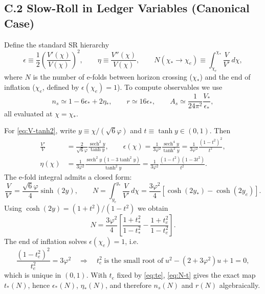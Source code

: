 \documentclass[11pt]{article}
\theoremstyle{definition}
\theoremstyle{remark}
\begin{document}
\subsection*{C.2 Slow-Roll in Ledger Variables (Canonical Case)}
Define the standard SR hierarchy
\begin{equation}
\epsilon \equiv \frac{1}{2}\left(\frac{V'(\chi)}{V(\chi)}\right)^2,\qquad
\eta \equiv \frac{V''(\chi)}{V(\chi)},
\qquad
N(\chi_*\to \chi_e) \equiv \int_{\chi_e}^{\chi_*}\frac{V}{V'}\,d\chi,
\label{eq:SR-defs}
\end{equation}
where $N$ is the number of e-folds between horizon crossing ($\chi_*$) and the end of inflation ($\chi_e$, defined by $\epsilon(\chi_e)=1$). To compute observables we use
\begin{equation}
n_s \simeq 1-6\epsilon_*+2\eta_*, \qquad r \simeq 16\epsilon_*, \qquad
A_s \simeq \frac{1}{24\pi^2}\frac{V_*}{\epsilon_*},
\label{eq:ns-r-As}
\end{equation}
all evaluated at $\chi=\chi_*$.

For \eqref{eq:V-tanh2}, write $y\equiv\chi/(\sqrt{6}\varphi)$ and $t\equiv\tanh y\in(0,1)$. Then
\begin{align}
\frac{V'}{V} &= \frac{2}{\sqrt{6}\varphi}\frac{\operatorname{sech}^2 y}{\tanh y},\qquad
\epsilon(\chi)=\frac{1}{3\varphi^2}\frac{\operatorname{sech}^4 y}{\tanh^2 y}
=\frac{1}{3\varphi^2}\frac{(1-t^2)^2}{t^2}, \label{eq:epsilon-t}\\
\eta(\chi)&=\frac{1}{3\varphi^2}\frac{\operatorname{sech}^2 y\,(1-3\tanh^2 y)}{\tanh^2 y}
=\frac{1}{3\varphi^2}\frac{(1-t^2)(1-3t^2)}{t^2}. \label{eq:eta-t}
\end{align}
The e-fold integral admits a closed form:
\begin{equation}
\frac{V}{V'}=\frac{\sqrt{6}\varphi}{4}\sinh(2y), \qquad
N=\int_{y_e}^{y_*}\frac{V}{V'}\,d\chi
= \frac{3\varphi^2}{4}\left[\cosh(2y_*)-\cosh(2y_e)\right].
\label{eq:N-y}
\end{equation}
Using $\cosh(2y)=(1+t^2)/(1-t^2)$ we obtain
\begin{equation}
N=\frac{3\varphi^2}{4}\left[\frac{1+t_*^2}{1-t_*^2} - \frac{1+t_e^2}{1-t_e^2}\right].
\label{eq:N-t}
\end{equation}
The end of inflation solves $\epsilon(\chi_e)=1$, i.e.
\begin{equation}
\frac{(1-t_e^2)^2}{t_e^2}=3\varphi^2
\quad\Longrightarrow\quad
t_e^2\;\text{is the small root of}\; u^2-(2+3\varphi^2)u+1=0,
\label{eq:te}
\end{equation}
which is unique in $(0,1)$. With $t_e$ fixed by \eqref{eq:te}, \eqref{eq:N-t} gives the exact map $t_*(N)$, hence $\epsilon_*(N)$, $\eta_*(N)$, and therefore $n_s(N)$ and $r(N)$ algebraically.
\end{document}
